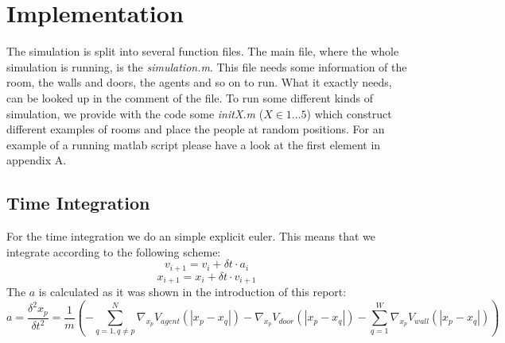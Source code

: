 \section{Implementation}
The simulation is split into several function files. The main file, where the
whole simulation is running, is the \textit{simulation.m}. This file needs
some information of the room, the walls and doors, the agents and so on to
run. What it exactly needs, can be looked up in the comment of the file.
To run some different kinds of simulation, we provide with the code some
\textit{initX.m} ($X \in 1\ldots5$) which construct different examples of
rooms and place the people at random positions. For an example of a running
matlab script please have a look at the first element in appendix A.

\subsection{Time Integration}
For the time integration we do an simple explicit euler. This means that we
integrate according to the following scheme: 
\[v_{i+1} = v_i + \delta t \cdot a_i \]
\[x_{i+1} = x_i + \delta t \cdot v_{i+1}\]
The $a$ is calculated as it was shown in the introduction of this report: 
\[ a = \frac{\delta^2 x_p}{\delta t^2}  = \frac{1}{m} \left( - \sum^{N}_{q = 1, q \neq p}
\nabla_{x_p} V_{agent}(|x_p - x_q|) - \nabla_{x_p} V_{door}(|x_p - x_q|) 
- \sum^{W}_{q = 1} \nabla_{x_p} V_{wall}(|x_p - x_q|)\right)\]

